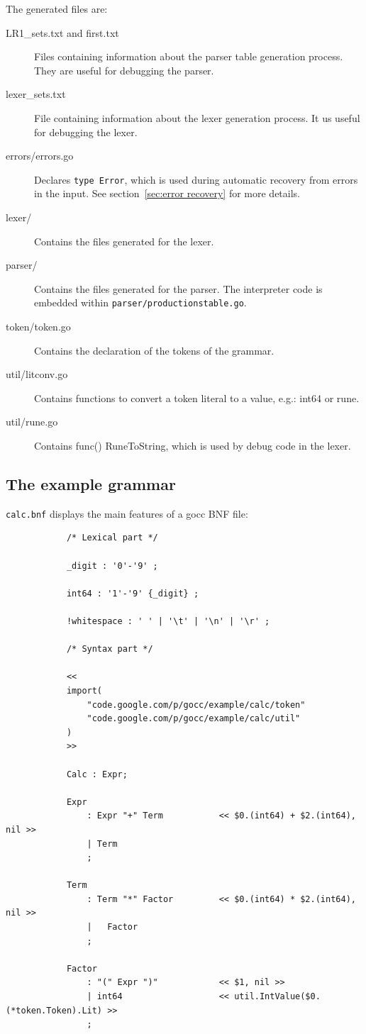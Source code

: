 \documentclass[12pt]{article}
\begin{document}
		The generated files are:
		\begin{description}
			\item[LR1\_sets.txt and first.txt] Files containing information about the parser table generation process. They are useful for debugging the parser.

			\item[lexer\_sets.txt] File containing information about the lexer generation process. It us useful for debugging the lexer.

			\item[errors/errors.go] Declares \verb|type Error|, which is used during automatic recovery from errors in the input. See section~\ref{sec:error recovery} for more details.

			\item[lexer/] Contains the files generated for the lexer.

			\item[parser/] Contains the files generated for the parser. The interpreter code is embedded within \verb|parser/productionstable.go|.

			\item[token/token.go] Contains the declaration of the tokens of the grammar.

			\item[util/litconv.go] Contains functions to convert a token literal to a value, e.g.: int64 or rune.

			\item[util/rune.go] Contains func() RuneToString, which is used by debug code in the lexer.
		\end{description}

	\subsection{The example grammar}
		\verb|calc.bnf| displays the main features of a gocc BNF file:

		\begin{verbatim}
			/* Lexical part */

			_digit : '0'-'9' ;

			int64 : '1'-'9' {_digit} ;

			!whitespace : ' ' | '\t' | '\n' | '\r' ;

			/* Syntax part */

			<< 
			import(
			    "code.google.com/p/gocc/example/calc/token"
			    "code.google.com/p/gocc/example/calc/util"
			)
			>>

			Calc : Expr;

			Expr
			    : Expr "+" Term           << $0.(int64) + $2.(int64), nil >>
			    | Term			
			    ;

			Term
			    : Term "*" Factor         << $0.(int64) * $2.(int64), nil >>
			    |	Factor			
			    ;

			Factor 
			    : "(" Expr ")"            << $1, nil >>
			    | int64                   << util.IntValue($0.(*token.Token).Lit) >>
			    ;

		\end{verbatim}
\end{document}
